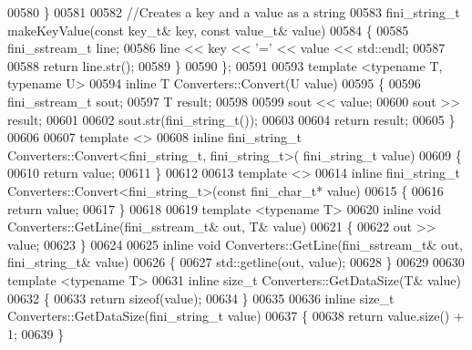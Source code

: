 \begin{DoxyCode}
00580    \}
00581 
00582    \textcolor{comment}{//Creates a key and a value as a string}
00583    fini_string_t makeKeyValue(\textcolor{keyword}{const} key\_t& key, \textcolor{keyword}{const} value\_t& value)
00584    \{
00585       fini_sstream_t line;
00586       line << key << \textcolor{charliteral}{'='} << value << std::endl;
00587 
00588       \textcolor{keywordflow}{return} line.str();
00589    \}
00590 \};
00591 
00593 \textcolor{keyword}{template} <\textcolor{keyword}{typename} T, \textcolor{keyword}{typename} U>
00594   \textcolor{keyword}{inline} T Converters::Convert(U value)
00595 \{
00596   fini_sstream_t sout;
00597   T result;
00598 
00599   sout << value;
00600   sout >> result;
00601 
00602   sout.str(fini_string_t());
00603 
00604   \textcolor{keywordflow}{return} result;
00605 \}
00606 
00607 \textcolor{keyword}{template} <>
00608   \textcolor{keyword}{inline} fini_string_t Converters::Convert<fini\_string\_t, fini\_string\_t>(
      fini_string_t value)
00609 \{
00610   \textcolor{keywordflow}{return} value;
00611 \}
00612 
00613 \textcolor{keyword}{template} <>
00614   \textcolor{keyword}{inline} fini_string_t Converters::Convert<fini\_string\_t>(\textcolor{keyword}{const} fini_char_t* value)
00615 \{
00616   \textcolor{keywordflow}{return} value;
00617 \}
00618 
00619 \textcolor{keyword}{template} <\textcolor{keyword}{typename} T>
00620   \textcolor{keyword}{inline} \textcolor{keywordtype}{void} Converters::GetLine(fini_sstream_t& out, T& value)
00621 \{
00622   out >> value;
00623 \}
00624 
00625 \textcolor{keyword}{inline} \textcolor{keywordtype}{void} Converters::GetLine(fini_sstream_t& out, fini_string_t& value)
00626 \{
00627   std::getline(out, value);
00628 \}
00629 
00630 \textcolor{keyword}{template} <\textcolor{keyword}{typename} T>
00631    \textcolor{keyword}{inline} \textcolor{keywordtype}{size\_t} Converters::GetDataSize(T& value)
00632 \{
00633    \textcolor{keywordflow}{return} \textcolor{keyword}{sizeof}(value);
00634 \}
00635 
00636 \textcolor{keyword}{inline} \textcolor{keywordtype}{size\_t} Converters::GetDataSize(fini_string_t value)
00637 \{
00638    \textcolor{keywordflow}{return} value.size() + 1;
00639 \}
\end{DoxyCode}
